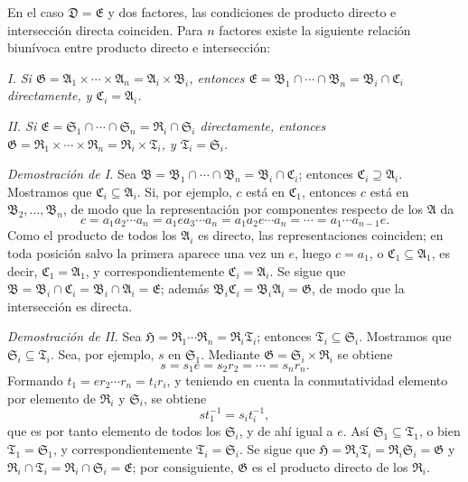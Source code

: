 \documentclass[11pt]{article}
\providecommand{\mG}{\mathfrak{G}}
\providecommand{\mA}{\mathfrak{A}}
\providecommand{\mB}{\mathfrak{B}}
\providecommand{\mC}{\mathfrak{C}}
\providecommand{\mD}{\mathfrak{D}}
\providecommand{\mE}{\mathfrak{E}}
\providecommand{\mH}{\mathfrak{H}}
\providecommand{\mR}{\mathfrak{R}}
\providecommand{\mS}{\mathfrak{S}}
\providecommand{\mT}{\mathfrak{T}}
\begin{document}
En el caso $\mD=\mE$ y dos factores, las condiciones de producto directo e intersección directa coinciden. Para $n$ factores existe la siguiente relación biunívoca entre producto directo e intersección:

\emph{I. Si $\mG=\mA_1\times\cdots\times\mA_n=\mA_i\times\mB_i$, entonces $\mE=\mB_1\cap\cdots\cap\mB_n=\mB_i\cap\mC_i$ directamente, y $\mC_i=\mA_i$.}

\emph{II. Si $\mE=\mS_1\cap\cdots\cap\mS_n=\mR_i\cap\mS_i$ directamente, entonces $\mG=\mR_1\times\cdots\times\mR_n=\mR_i\times\mT_i$, y $\mT_i=\mS_i$.}

\emph{Demostración de I.} Sea $\mB=\mB_1\cap\cdots\cap\mB_n=\mB_i\cap\mC_i$; entonces $\mC_i\supseteq\mA_i$. Mostramos que $\mC_i\subseteq\mA_i$. Si, por ejemplo, $c$ está en $\mC_1$, entonces $c$ está en $\mB_2,\ldots,\mB_n$, de modo que la representación por componentes respecto de los $\mA$ da
\[
        c=a_1a_2\cdots a_n=a_1ea_3\cdots a_n=a_1a_2e\cdots a_n=\cdots=a_1\cdots a_{n-1}e.
\]
Como el producto de todos los $\mA_i$ es directo, las representaciones coinciden; en toda posición salvo la primera aparece una vez un $e$, luego $c=a_1$, o $\mC_1\subseteq\mA_1$, es decir, $\mC_1=\mA_1$, y correspondientemente $\mC_i=\mA_i$. Se sigue que $\mB=\mB_i\cap\mC_i=\mB_i\cap\mA_i=\mE$; además $\mB_i\mC_i=\mB_i\mA_i=\mG$, de modo que la intersección es directa.

\emph{Demostración de II.} Sea $\mH=\mR_1\cdots\mR_n=\mR_i\mT_i$; entonces $\mT_i\subseteq\mS_i$. Mostramos que $\mS_i\subseteq\mT_i$. Sea, por ejemplo, $s$ en $\mS_1$. Mediante $\mG=\mS_i\times\mR_i$ se obtiene
\[
        s=s_1e=s_2r_2=\cdots=s_nr_n.
\]
Formando $t_1=er_2\cdots r_n=t_ir_i$, y teniendo en cuenta la conmutatividad elemento por elemento de $\mR_i$ y $\mS_i$, se obtiene
\[
        st_1^{-1}=s_it_i^{-1},
\]
que es por tanto elemento de todos los $\mS_i$, y de ahí igual a $e$. Así $\mS_1\subseteq\mT_1$, o bien $\mT_1=\mS_1$, y correspondientemente $\mT_i=\mS_i$. Se sigue que $\mH=\mR_i\mT_i=\mR_i\mS_i=\mG$ y $\mR_i\cap\mT_i=\mR_i\cap\mS_i=\mE$; por consiguiente, $\mG$ es el producto directo de los $\mR_i$.
\end{document}
